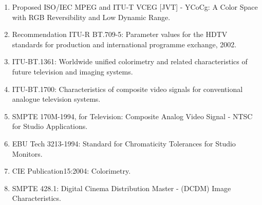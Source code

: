 \begin{enumerate}  
\item	Proposed ISO/IEC MPEG and ITU-T VCEG [JVT] - YCoCg: A Color Space with RGB Reversibility and Low Dynamic Range.
\item	Recommendation ITU-R BT.709-5: Parameter values for the HDTV standards for production and international programme exchange, 2002. 
\item	ITU-BT.1361: Worldwide unified colorimetry and related characteristics of future television and imaging systems.
\item	ITU-BT.1700: Characteristics of composite video signals for conventional analogue television systems.
\item	SMPTE 170M-1994, for Television: Composite Analog Video Signal - NTSC for Studio Applications.
\item	EBU Tech 3213-1994: Standard for Chromaticity Tolerances for Studio Monitors.
\item	CIE Publication15:2004: Colorimetry.
\item	SMPTE 428.1: Digital Cinema Distribution Master - (DCDM) Image Characteristics.
\end{enumerate}